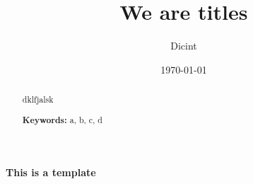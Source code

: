 \documentclass[a4paper,11pt]{article}
\title{\huge \textbf{We are titles}}
\author{ \team}
\date{\today}
\begin{document}
\begin{abstract}

\par dklfjalsk
\par \textbf{Keywords:} a, b, c, d 

\end{abstract}
\pagestyle{fancy} 
\maketitle

\newpage                                                          %
\begin{center}
{\huge \textbf{This is a template}}\\
\author{Dicint}
\end{center}

\tableofcontents   
\pagestyle{fancy}                            
\newpage
\pagestyle{fancy}                                                     

\end{document}
